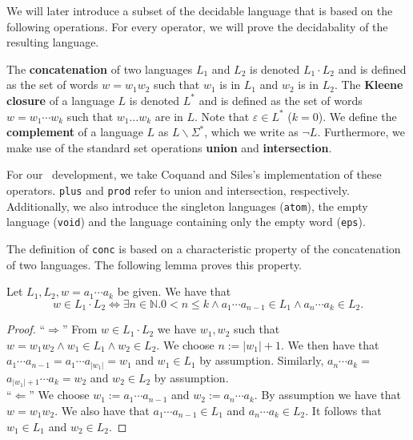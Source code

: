     
    We will later introduce a subset of the decidable language that is based on the following operations. For every operator, we will prove the decidabality of the resulting language.

    

    The \textbf{concatenation} of two languages $L_1$ and $L_2$ is denoted $L_1 \cdot L_2$ and is defined as the set of words $w = w_1 w_2$ such that $w_1$ is in $L_1$ and $w_2$ is in $L_2$.
    The \textbf{Kleene closure} of a language $L$ is denoted $L^*$ and is defined as the set of words $w = w_1 \cdots w_k$ such that $w_1 \ldots w_k$ are in $L$. 
    Note that $\varepsilon \in L^*$ ($k=0$).
    We define the \textbf{complement} of a language $L$ as $L \backslash \Sigma^*$, which we write as $\neg L$.
    Furthermore, we make use of the standard set operations \textbf{union} and \textbf{intersection}.

    
    For our \coq\ development,
    we take Coquand and Siles's \cite{DBLP:conf/cpp/CoquandS11} implementation of these operators. 
    \lstinline{plus} and \lstinline{prod} refer to union and intersection, respectively. 
    Additionally, we also introduce the singleton languages (\lstinline{atom}), the empty language (\lstinline{void}) and the language containing only the empty word (\lstinline{eps}).


    
    The definition of \lstinline{conc} is based on a characteristic property of the concatenation of two languages. The following lemma proves this property.

    \begin{lemma}
        \label{concP}
        Let $L_1, L_2, w = a_1 \cdots a_k$ be given. We have that
        \begin{equation*}
            w \in L_1 \cdot L_2  
            \iff
            \exists n \in \mathbb{N}. 0 < n \le k \wedge a_1 \cdots a_{n-1} \in L_1 \wedge a_n \cdots a_k \in L_2.
        \end{equation*}
    \end{lemma}
    \begin{proof}
        ``$\Rightarrow$'' 
        From $w \in L_1 \cdot L_2$ we have $w_1, w_2$ such that $w = w_1 w_2 \wedge w_1 \in L_1 \wedge w_2 \in L_2$.
        We choose $n := |w_1|+1$. We then have that $a_1 \cdots a_{n-1} = a_1 \cdots a_{|w_1|} = w_1$ and $w_1 \in L_1$ by assumption.
        Similarly, $a_{n} \cdots a_k = $$ a_{|w_1| + 1} \cdots a_k = w_2$ and $w_2 \in L_2$ by assumption.
        \\
        ``$\Leftarrow$'' 
        We choose $w_1 := a_1 \cdots a_{n-1}$ and $w_2 := a_n \cdots a_k$. By assumption we have that $w = w_1 w_2$.
        We also have that $a_1 \cdots a_{n-1} \in L_1$ and $a_{n} \cdots a_k \in L_2$. 
        It follows that $w_1 \in L_1$ and $w_2 \in L_2$.
    \end{proof}
    
